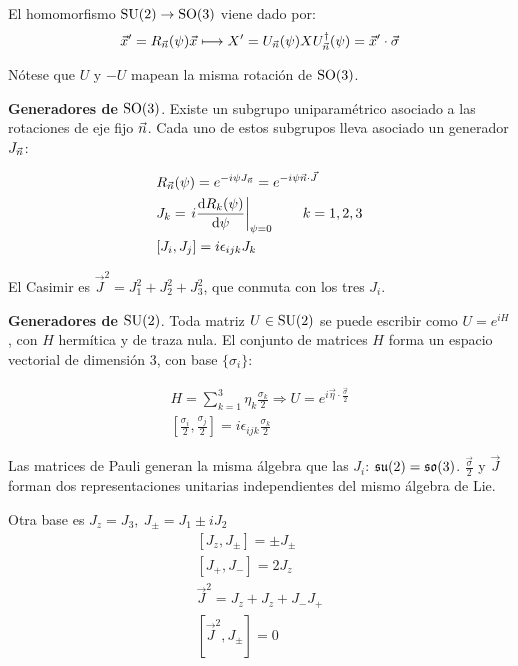 El homomorfismo $\mathrm{SU}(2)\rightarrow\mathrm{SO}(3)$ viene dado por:
\begin{equation}
\vec{x}'=R_{\vec{n}}(\psi) \vec{x}\longmapsto		X'=U_{\vec{n}}(\psi)X U_{\vec{n}}^\dagger(\psi)=\vec{x}'\cdot \vec{\sigma}
\end{equation}

Nótese que $U$ y $-U$ mapean la misma rotación de $\mathrm{SO}(3)$.

\begin{flushleft}
\textbf{Generadores de $\mathrm{SO}(3)$}. Existe un subgrupo uniparamétrico asociado a las rotaciones de eje fijo $\vec{n}$. Cada uno de estos subgrupos lleva asociado un generador $J_{\vec{n}}$:
\end{flushleft}

\begin{subequations}
\begin{flalign}
& R_{\vec{n}}(\psi)=e^{-i\psi J_{\vec{n}}}=e^{-i\psi \vec{n} \cdot \vec{J}}\\
&J_k=\left. i\frac{\mathrm{d}R_k(\psi)}{\mathrm{d}\psi}\right|_{\psi=0}\qquad k=1,2,3\\
&[J_i,J_j]=i\epsilon_{ijk} J_k
\end{flalign}
\end{subequations}

El Casimir es $\vec{J}^2=J_1^2+J_2^2+J_3^2$, que conmuta con los tres $J_i$.


\begin{flushleft}
\textbf{Generadores de $\mathrm{SU}(2)$}. Toda matriz $U\in\mathrm{SU}(2)$ se puede escribir como $U=e^{iH}$, con $H$ hermítica y de traza nula. El conjunto de matrices $H$ forma un espacio vectorial de dimensión 3, con base $\{\sigma_i\}$:
\end{flushleft}

\begin{subequations}
\begin{gather}
H=\sum_{k=1}^3\eta_k \frac{\sigma_k}{2}\Longrightarrow U=e^{i\vec{\eta}\cdot \frac{\vec{\sigma}}{2}}\\
\left[\frac{\sigma_i}{2},\frac{\sigma_j}{2}\right]=i\epsilon_{ijk} \frac{\sigma_k}{2}
\end{gather}
\end{subequations}

Las matrices de Pauli generan la misma álgebra que las $J_i$: $\mathfrak{su}(2)=\mathfrak{so}(3)$. $\frac{\vec{\sigma}}{2}$ y $\vec{J}$ forman dos representaciones unitarias independientes del mismo álgebra de Lie.\medskip

Otra base es $J_z=J_3,\ J_\pm=J_1\pm iJ_2$
\begin{subequations}
\begin{gather}
[J_z,J_\pm]=\pm J_\pm\\
[J_+,J_-]=2J_z\\
\vec{J}^2=J_z+J_z+J_-J_+\\
[\vec{J}^2,J_\pm]=0
\end{gather}
\end{subequations}

